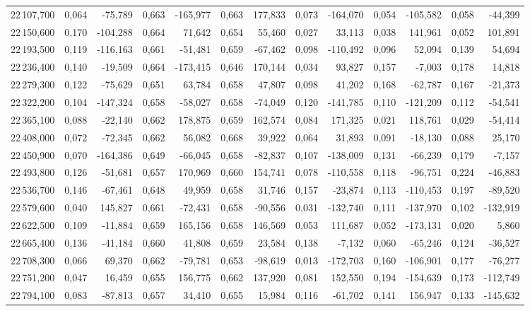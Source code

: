 \begin{longtable}{rrrrrrrrrrrrr}
22\,107,700 & 0,064 & -75,789 & 0,663 & -165,977 & 0,663 & 177,833 & 0,073 & -164,070 & 0,054 & -105,582 & 0,058 & -44,399\\
22\,150,600 & 0,170 & -104,288 & 0,664 & 71,642 & 0,654 & 55,460 & 0,027 & 33,113 & 0,038 & 141,961 & 0,052 & 101,891\\
22\,193,500 & 0,119 & -116,163 & 0,661 & -51,481 & 0,659 & -67,462 & 0,098 & -110,492 & 0,096 & 52,094 & 0,139 & 54,694\\
22\,236,400 & 0,140 & -19,509 & 0,664 & -173,415 & 0,646 & 170,144 & 0,034 & 93,827 & 0,157 & -7,003 & 0,178 & 14,818\\
22\,279,300 & 0,122 & -75,629 & 0,651 & 63,784 & 0,658 & 47,807 & 0,098 & 41,202 & 0,168 & -62,787 & 0,167 & -21,373\\
22\,322,200 & 0,104 & -147,324 & 0,658 & -58,027 & 0,658 & -74,049 & 0,120 & -141,785 & 0,110 & -121,209 & 0,112 & -54,541\\
22\,365,100 & 0,088 & -22,140 & 0,662 & 178,875 & 0,659 & 162,574 & 0,084 & 171,325 & 0,021 & 118,761 & 0,029 & -54,414\\
22\,408,000 & 0,072 & -72,345 & 0,662 & 56,082 & 0,668 & 39,922 & 0,064 & 31,893 & 0,091 & -18,130 & 0,088 & 25,170\\
22\,450,900 & 0,070 & -164,386 & 0,649 & -66,045 & 0,658 & -82,837 & 0,107 & -138,009 & 0,131 & -66,239 & 0,179 & -7,157\\
22\,493,800 & 0,126 & -51,681 & 0,657 & 170,969 & 0,660 & 154,741 & 0,078 & -110,558 & 0,118 & -96,751 & 0,224 & -46,883\\
22\,536,700 & 0,146 & -67,461 & 0,648 & 49,959 & 0,658 & 31,746 & 0,157 & -23,874 & 0,113 & -110,453 & 0,197 & -89,520\\
22\,579,600 & 0,040 & 145,827 & 0,661 & -72,431 & 0,658 & -90,556 & 0,031 & -132,740 & 0,111 & -137,970 & 0,102 & -132,919\\
22\,622,500 & 0,109 & -11,884 & 0,659 & 165,156 & 0,658 & 146,569 & 0,053 & 111,687 & 0,052 & -173,131 & 0,020 & 5,860\\
22\,665,400 & 0,136 & -41,184 & 0,660 & 41,808 & 0,659 & 23,584 & 0,138 & -7,132 & 0,060 & -65,246 & 0,124 & -36,527\\
22\,708,300 & 0,066 & 69,370 & 0,662 & -79,781 & 0,653 & -98,619 & 0,013 & -172,703 & 0,160 & -106,901 & 0,177 & -76,277\\
22\,751,200 & 0,047 & 16,459 & 0,655 & 156,775 & 0,662 & 137,920 & 0,081 & 152,550 & 0,194 & -154,639 & 0,173 & -112,749\\
22\,794,100 & 0,083 & -87,813 & 0,657 & 34,410 & 0,655 & 15,984 & 0,116 & -61,702 & 0,141 & 156,947 & 0,133 & -145,632\\

\end{longtable}
